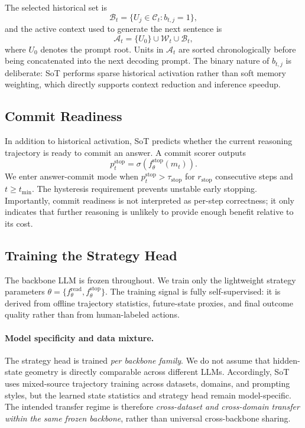 \documentclass{article}
\newcommand{\sigmoid}{\sigma}
\begin{document}
The selected historical set is
\begin{equation}
 \mathcal{B}_t = \{U_j\in\mathcal{C}_t: b_{t,j}=1\},
\label{eq:Bt}
\end{equation}
and the active context used to generate the next sentence is
\begin{equation}
 \mathcal{A}_t = \{U_0\}\cup\mathcal{W}_t\cup\mathcal{B}_t,
\label{eq:At}
\end{equation}
where $U_0$ denotes the prompt root. Units in $\mathcal{A}_t$ are sorted chronologically before being concatenated into the next decoding prompt. The binary nature of $b_{t,j}$ is deliberate: SoT performs sparse historical activation rather than soft memory weighting, which directly supports context reduction and inference speedup.

\subsection{Commit Readiness}
\label{sec:stop}
In addition to historical activation, SoT predicts whether the current reasoning trajectory is ready to commit an answer. A commit scorer outputs
\begin{equation}
 p_t^{\mathrm{stop}} = \sigmoid\!\left(f_{\theta}^{\mathrm{stop}}(m_t)\right).
\label{eq:stopprob}
\end{equation}
We enter answer-commit mode when $p_t^{\mathrm{stop}}>\tau_{\mathrm{stop}}$ for $r_{\mathrm{stop}}$ consecutive steps and $t\ge t_{\min}$. The hysteresis requirement prevents unstable early stopping. Importantly, commit readiness is not interpreted as per-step correctness; it only indicates that further reasoning is unlikely to provide enough benefit relative to its cost.

\subsection{Training the Strategy Head}
\label{sec:training}
The backbone LLM is frozen throughout. We train only the lightweight strategy parameters $\theta=\{f_{\theta}^{\mathrm{read}},f_{\theta}^{\mathrm{stop}}\}$. The training signal is fully self-supervised: it is derived from offline trajectory statistics, future-state proxies, and final outcome quality rather than from human-labeled actions.

\paragraph{Model specificity and data mixture.}
The strategy head is trained \emph{per backbone family}. We do not assume that hidden-state geometry is directly comparable across different LLMs. Accordingly, SoT uses mixed-source trajectory training across datasets, domains, and prompting styles, but the learned state statistics and strategy head remain model-specific. The intended transfer regime is therefore \emph{cross-dataset and cross-domain transfer within the same frozen backbone}, rather than universal cross-backbone sharing.
\end{document}
